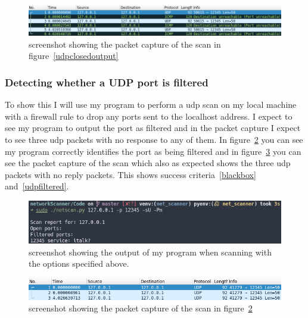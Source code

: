 \documentclass[titlepage]{article}
\let\Oldsubsubsection\subsubsection{}
\renewcommand{\subsubsection}{\FloatBarrier\Oldsubsubsection}
\begin{document}
\begin{figure}[H]
  \centering
  \includegraphics[width=\textwidth]{udpclosedpcap.png}
  \caption{%
    screenshot showing the packet capture of the scan in figure~\ref{udpclosedoutput}
  }\label{udpclosedcap}
\end{figure}

\subsubsection{Detecting whether a UDP port is filtered}
To show this I will use my program to perform a \gls{udp} scan on my local machine
with a firewall rule to drop any ports sent to the localhost address. I expect to see
my program to output the port as filtered and in the packet capture I expect to see
three \gls{udp} packets with no response to any of them.
In figure~\ref{udpfilteredoutput} you can see my program correctly identifies
the port as being filtered and in figure~\ref{udpfilteredpcap} you can see
the packet capture of the scan which also as expected shows the three \gls{udp}
packets with no reply packets. This shows success criteria~\ref{blackbox}
and~\ref{udpfiltered}.

\begin{figure}[H]
  \centering
  \includegraphics[width=\textwidth]{udpfilteredoutput.png}
  \caption{%
    screenshot showing the output of my program when scanning with the
    options specified above.
  }\label{udpfilteredoutput}
\end{figure}

\begin{figure}[H]
  \centering
  \includegraphics[width=\textwidth]{udpfilteredpcap.png}
  \caption{%
    screenshot showing the packet capture of the scan in figure~\ref{udpfilteredoutput}
  }\label{udpfilteredpcap}
\end{figure}
\end{document}
